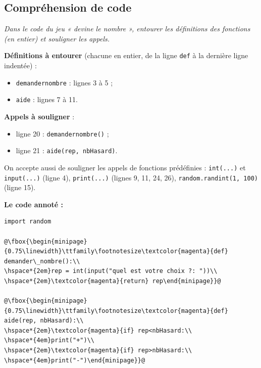 \documentclass[addpoints, 11pt]{exam}
\newcommand{\enonce}[1]{\textit{#1}\par\smallskip}
\newcommand{\code}[1]{\texttt{#1}}
\DeclareRobustCommand{\_}{\textunderscore\allowbreak}
\begin{document}
\begin{questions}
\section{Compréhension de code}

\question[3] \enonce{Dans le code du jeu « devine le nombre », entourer les définitions des fonctions (en entier) et souligner les appels.}
\begin{reponse}
\textbf{Définitions à entourer} (chacune en entier, de la ligne \code{def} à la dernière ligne indentée) :
\begin{itemize}
  \item \code{demander\_nombre} : lignes 3 à 5 ;
  \item \code{aide} : lignes 7 à 11.
\end{itemize}
\textbf{Appels à souligner} :
\begin{itemize}
  \item ligne 20 : \code{demander\_nombre()} ;
  \item ligne 21 : \code{aide(rep, nbHasard)}.
\end{itemize}
On accepte aussi de souligner les appels de fonctions prédéfinies : \code{int(...)} et \code{input(...)} (ligne 4), \code{print(...)} (lignes 9, 11, 24, 26), \code{random.randint(1, 100)} (ligne 15).
\end{reponse}
\textbf{Le code annoté :}
\begin{lstlisting}[escapechar=@, numbers=none]
import random

@\fbox{\begin{minipage}{0.75\linewidth}\ttfamily\footnotesize\textcolor{magenta}{def} demander\_nombre():\\
\hspace*{2em}rep = int(input("quel est votre choix ?: "))\\
\hspace*{2em}\textcolor{magenta}{return} rep\end{minipage}}@

@\fbox{\begin{minipage}{0.75\linewidth}\ttfamily\footnotesize\textcolor{magenta}{def} aide(rep, nbHasard):\\
\hspace*{2em}\textcolor{magenta}{if} rep<nbHasard:\\
\hspace*{4em}print("+")\\
\hspace*{2em}\textcolor{magenta}{if} rep>nbHasard:\\
\hspace*{4em}print("-")\end{minipage}}@


\end{lstlisting}
\end{questions}
\end{document}
